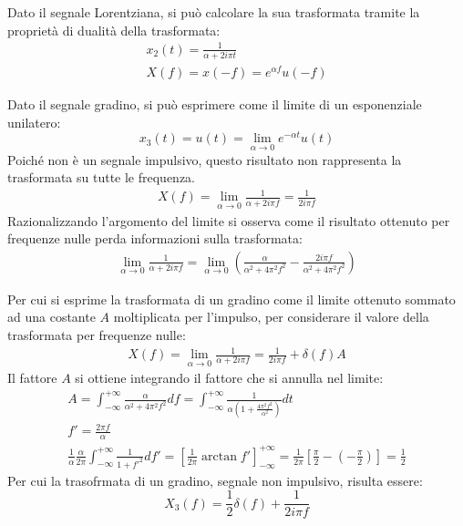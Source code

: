 \documentclass{article}
\numberwithin{equation}{subsection}
\begin{document}
Dato il segnale Lorentziana, si può calcolare la sua trasformata tramite la proprietà di dualità della trasformata: 
\begin{gather*}
    x_2(t)=\displaystyle\frac{1}{\alpha+2i\pi t}\\
    X(f)=x(-f)=e^{\alpha f}u(-f)
\end{gather*}



Dato il segnale gradino, si può esprimere come il limite di un esponenziale unilatero:
\begin{equation*}
    x_3(t)=u(t)=\lim_{\alpha\to0}e^{-\alpha t}{u(t)}
\end{equation*}
Poiché non è un segnale impulsivo, questo risultato non rappresenta la trasformata su tutte le frequenza. 
\begin{gather*}
    X(f)=\displaystyle\lim_{\alpha\to0}\frac{1}{\alpha+2i\pi f}=\frac{1}{2i\pi f}
\end{gather*}
Razionalizzando l'argomento del limite si osserva come il risultato ottenuto per frequenze nulle perda informazioni sulla trasformata:
\begin{gather*}
    \displaystyle\lim_{\alpha\to0}\frac{1}{\alpha+2i\pi f}=\lim_{\alpha\to0}\left(\frac{\alpha}{\alpha^2+4\pi^2f^2}-\frac{2i\pi f}{\alpha^2+4\pi^2f^2}\right)
\end{gather*}


Per cui si esprime la trasformata di un gradino come il limite ottenuto sommato ad una costante $A$ moltiplicata per l'impulso, per considerare il valore della trasformata 
per frequenze nulle: 
\begin{gather*}
    X(f)=\displaystyle\lim_{\alpha\to0}\frac{1}{\alpha+2i\pi f}=\frac{1}{2i\pi f}+\delta(f)A
\end{gather*}
Il fattore $A$ si ottiene integrando il fattore che si annulla nel limite:
\begin{gather*}
    A=\displaystyle\int_{-\infty}^{+\infty}\frac{\alpha}{\alpha^2+4\pi^2f^2}df=\int_{-\infty}^{+\infty}\frac{1}{\alpha\left(1+\frac{4\pi^2f^2}{\alpha^2}\right)}dt\\
    f'=\displaystyle\frac{2\pi f}{\alpha}\\
    \displaystyle\frac{1}{\alpha}\frac{\alpha}{2\pi}\int_{-\infty}^{+\infty}\frac{1}{1+f'^2}df'=\left[\frac{1}{2\pi}\arctan f'\right]^{+\infty}_{-\infty}=\frac{1}{2\pi}\left[\frac{\pi}{2}-\left(-\frac{\pi}{2}\right)\right]=\frac{1}{2}
\end{gather*}
Per cui la trasofrmata di un gradino, segnale non impulsivo, risulta essere:
\begin{equation*}
    X_3(f)=\displaystyle\frac{1}{2}\delta(f)+\frac{1}{2i\pi f}
\end{equation*}
\end{document}
